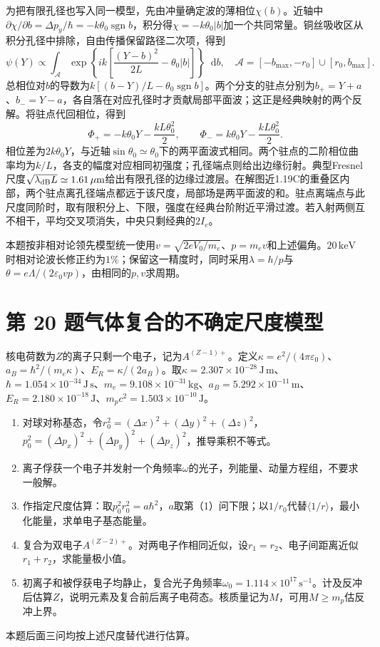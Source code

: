\documentclass[UTF8,fontset=fandol,a4paper,11pt]{ctexart}
\newcommand{\dd}{\mathop{}\!\mathrm{d}}
\begin{document}
为把有限孔径也写入同一模型，先由冲量确定波的薄相位$\chi(b)$。近轴中$\partial\chi/\partial b=\Delta p_y/\hbar=-k\theta_0\operatorname{sgn}b$，积分得$\chi=-k\theta_0|b|$加一个共同常量。铜丝吸收区从积分孔径中排除，自由传播保留路径二次项，得到
\[
\psi(Y)\propto\int_{\mathcal A}
\exp\left\{ik\left[\frac{(Y-b)^2}{2L}-\theta_0|b|\right]\right\}\dd b,
\quad
\mathcal A=[-b_{\max},-r_0]\cup[r_0,b_{\max}].
\]
总相位对$b$的导数为$k[(b-Y)/L-\theta_0\operatorname{sgn}b]$。两个分支的驻点分别为$b_+=Y+a$、$b_-=Y-a$，各自落在对应孔径时才贡献局部平面波；这正是经典映射的两个反解。将驻点代回相位，得到
\[
\Phi_+=-k\theta_0Y-\frac{kL\theta_0^2}{2},\qquad
\Phi_-=k\theta_0Y-\frac{kL\theta_0^2}{2}.
\]
相位差为$2k\theta_0Y$，与近轴$\sin\theta_0\simeq\theta_0$下的两平面波式相同。两个驻点的二阶相位曲率均为$k/L$，各支的幅度对应相同初强度；孔径端点则给出边缘衍射。典型Fresnel尺度$\sqrt{\lambda_{\rm dB}L}\simeq1.61\,\mu\mathrm m$给出有限孔径的边缘过渡层。在解图近1.19C的重叠区内部，两个驻点离孔径端点都远于该尺度，局部场是两平面波的和。驻点离端点与此尺度同阶时，取有限积分上、下限，强度在经典台阶附近平滑过渡。若入射两侧互不相干，平均交叉项消失，中央只剩经典的$2I_e$。

本题按非相对论领先模型统一使用$v=\sqrt{2eV_0/m_e}$、$p=m_ev$和上述偏角。$20\,\mathrm{keV}$时相对论波长修正约为$1\%$；保留这一精度时，同时采用$\lambda=h/p$与$\theta=e\Lambda/(2\varepsilon_0vp)$，由相同的$p,v$求周期。




\section*{第 20 题\quad 气体复合的不确定尺度模型}\label{q:20}

核电荷数为$Z$的离子只剩一个电子，记为$A^{(Z-1)+}$。定义$\kappa=e^2/(4\pi\varepsilon_0)$、$a_B=\hbar^2/(m_e\kappa)$、$E_R=\kappa/(2a_B)$。取$\kappa=2.307\times10^{-28}\,\mathrm{J\,m}$、$\hbar=1.054\times10^{-34}\,\mathrm{J\,s}$、$m_e=9.108\times10^{-31}\,\mathrm{kg}$、$a_B=5.292\times10^{-11}\,\mathrm m$、$E_R=2.180\times10^{-18}\,\mathrm J$、$m_pc^2=1.503\times10^{-10}\,\mathrm J$。
\begin{enumerate}[label=（\arabic*）]
\item 对球对称基态，令$r_0^2=(\Delta x)^2+(\Delta y)^2+(\Delta z)^2$，$p_0^2=(\Delta p_x)^2+(\Delta p_y)^2+(\Delta p_z)^2$，推导乘积不等式。
\item 离子俘获一个电子并发射一个角频率$\omega$的光子，列能量、动量方程组，不要求一般解。
\item 作指定尺度估算：取$p_0^2r_0^2=a\hbar^2$，$a$取第（1）问下限；以$1/r_0$代替$\langle1/r\rangle$，最小化能量，求单电子基态能量。
\item 复合为双电子$A^{(Z-2)+}$。对两电子作相同近似，设$r_1=r_2$、电子间距离近似$r_1+r_2$，求能量极小值。
\item 初离子和被俘获电子均静止，复合光子角频率$\omega_0=1.114\times10^{17}\,\mathrm{s^{-1}}$。计及反冲后估算$Z$，说明元素及复合前后离子电荷态。核质量记为$M$，可用$M\geqslant m_p$估反冲上界。
\end{enumerate}
本题后面三问均按上述尺度替代进行估算。
\end{document}
